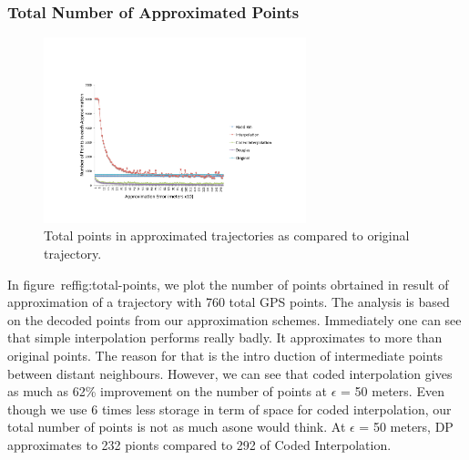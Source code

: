 \documentclass[conference]{IEEEtran}
\begin{document}
\subsubsection{Total Number of Approximated Points}
  \begin{figure}[h]
  \centering
  \includegraphics[width=3in]{images/total-points.pdf}
  \caption {Total points in approximated trajectories as compared to original trajectory.}
  \label{fig:total-points}
\end{figure}
In figure~ref{fig:total-points}, we plot the number of points obrtained in result of approximation of a trajectory with 760 total GPS points. The analysis is based on the decoded points from our approximation schemes. Immediately one can see that simple interpolation performs really badly. It approximates to more than original points. The reason for that is the intro duction of intermediate points between distant neighbours. However, we can see that coded interpolation gives as much as 62\% improvement on the number of points at $\epsilon$ = 50 meters. Even though we use 6 times less storage in term of space for coded interpolation, our total number of points is not as much asone would think. At $\epsilon$ = 50 meters, DP approximates to 232 pionts compared to 292 of Coded Interpolation.
\end{document}
